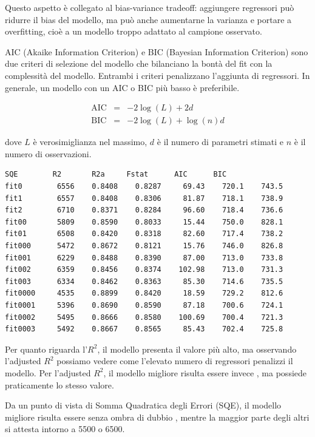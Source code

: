 Questo aspetto è collegato al bias-variance tradeoff: aggiungere regressori può ridurre il bias del modello, ma può anche aumentarne la varianza e portare a overfitting, cioè a un modello troppo adattato al campione osservato.

AIC (Akaike Information Criterion) e BIC (Bayesian Information Criterion) sono due criteri di selezione del modello che bilanciano la bontà del fit con la complessità del modello. Entrambi i criteri penalizzano l'aggiunta di regressori. In generale, un modello con un AIC o BIC più basso è preferibile.

\[
\begin{array}{rcl}
\text{AIC} & = & -2\log(L) + 2d
\\
\text{BIC} & = & -2\log(L) + \log(n)d
\end{array}
\]

dove $L$ è verosimiglianza nel massimo, $d$ è il numero di parametri stimati e $n$ è il numero di osservazioni.

\begin{lstlisting}[style=rconsole]
             SQE        R2       R2a     Fstat      AIC      BIC
fit0        6556    0.8408    0.8287     69.43    720.1    743.5
fit1        6557    0.8408    0.8306     81.87    718.1    738.9
fit2        6710    0.8371    0.8284     96.60    718.4    736.6
fit00       5809    0.8590    0.8033     15.44    750.0    828.1
fit01       6508    0.8420    0.8318     82.60    717.4    738.2
fit000      5472    0.8672    0.8121     15.76    746.0    826.8
fit001      6229    0.8488    0.8390     87.00    713.0    733.8
fit002      6359    0.8456    0.8374    102.98    713.0    731.3
fit003      6334    0.8462    0.8363     85.30    714.6    735.5
fit0000     4535    0.8899    0.8420     18.59    729.2    812.6
fit0001     5396    0.8690    0.8590     87.18    700.6    724.1
fit0002     5495    0.8666    0.8580    100.69    700.4    721.3
fit0003     5492    0.8667    0.8565     85.43    702.4    725.8
\end{lstlisting}

Per quanto riguarda l'$R^2$, il modello \texttt{} presenta il valore più alto, ma osservando l'adjusted $R^2$ possiamo vedere come l'elevato numero di regressori penalizzi il modello. Per l'adjusted $R^2$, il modello migliore risulta essere invece \texttt{}, ma \texttt{} possiede praticamente lo stesso valore.

Da un punto di vista di Somma Quadratica degli Errori (SQE), il modello migliore risulta essere senza ombra di dubbio \texttt{}, mentre la maggior parte degli altri si attesta intorno a 5500 o 6500.

